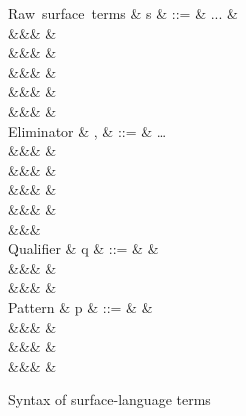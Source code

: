 \begin{figure}[H]
\begin{syntaxfig}
\mbox{Raw surface terms}
&
s
&
::=
&
...
&
\\
&&&
&
\\
&&&
&
\\
&&&
&
\\
&&&
&
\\
&&&
\exLambda{\sigma}
&
\\[2mm]

\mbox{Eliminator}
&
\sigma, \tau
&
::=
&
\ldots
\\
&&&
\elimBoolTrue{\kappa}
&
\\
&&&
\elimBoolFalse{\kappa}
&
\\
&&&
\elimListSingleton{\branchNil{\kappa}}
&
\\
&&&
\elimListSingleton{\branchCons{\sigma}}
&
\\
&&&
\\[2mm]

\mbox{Qualifier}
&
q
&
::=
&
&
\\
&&&
&
\\
&&&
&
\\[2mm]


\mbox{Pattern}
&
p
&
::=
&
&
\\
&&&
\pattNil
&
\\
&&&
&
\\
&&&
&
\\[2mm]
\end{syntaxfig}
\caption{Syntax of surface-language terms}
\end{figure}
